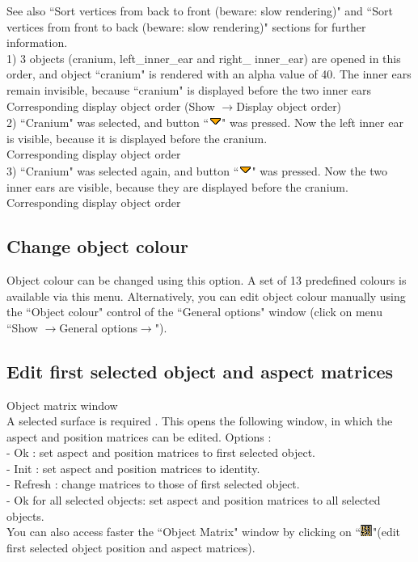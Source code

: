 See also ``Sort vertices from back to front (beware: slow rendering)" and ``Sort vertices from front to back (beware: slow rendering)" sections for further information.\\


1) 3 objects (cranium, left\_inner\_ear and right\_
inner\_ear) are opened in this order, and object
``cranium" is rendered with an alpha value of 40.
The inner ears remain invisible, because ``cranium"
is displayed before the two inner ears\\
Corresponding display object order (Show $\rightarrow$Display
object order)\\
2) ``Cranium" was selected, and button ``\includegraphics[scale=0.7]{images/pixmap/s_dessus_17.png}" was
pressed. Now the left inner ear is visible, because
it is displayed before the cranium.\\
Corresponding display object order\\

3) ``Cranium" was selected again, and button ``\includegraphics[scale=0.7]{images/pixmap/s_dessus_17.png}" was pressed. Now the two inner ears are
visible, because they are displayed before the
cranium.\\
Corresponding display object order


\subsection{Change object colour}
Object colour can be changed using this option. A set of 13 predefined colours is available via this menu. Alternatively, you can edit object colour manually using the ``Object colour" control of the ``General options" window (click on menu ``Show $\rightarrow$General options$\rightarrow$").

\subsection{Edit first selected object and aspect matrices}
Object matrix window\\

A selected surface is required . This opens the following window,
in which the aspect and position matrices can be edited.
Options :\\
- Ok : set aspect and position matrices to first selected object.\\
- Init : set aspect and position matrices to identity.\\
- Refresh : change matrices to those of first selected object.\\
- Ok for all selected objects: set aspect and position matrices to
all selected objects.\\
You can also access faster the ``Object Matrix" window by clicking
on ``\includegraphics[scale=0.7]{images/pixmap/mat.png}"(edit first selected object position and aspect matrices).

